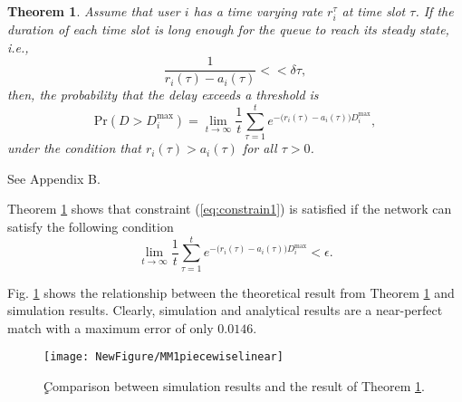\documentclass[journal,draftclsnofoot,onecolumn,12pt]{IEEEtran}%
\newtheorem{theorem}{\bf Theorem}
\begin{document}
	\begin{theorem} \label{prop:packet length}
		Assume that user $i$ has a time varying rate $r_i^{\tau}$ at time slot $\tau$. If the duration  of each time slot is long enough for the queue to reach its steady state, i.e., 
		\begin{equation}\label{eq:time slot condition}
		\frac{1}{r_i(\tau)-a_i(\tau)}<<\delta \tau,
		\end{equation}
		then, the probability that the delay exceeds a threshold is 
		\begin{equation}\label{eq:time average delay}
		\text{Pr}(D>D_i^{\max})=	\lim_{t\to \infty} \frac{1}{t} \sum_{\tau=1}^{t} e^{-\big(r_i(\tau)-a_i(\tau)\big)D_i^{\max}},	
		\end{equation}
		under the condition that $r_i(\tau)>a_i(\tau)$ for all $\tau>0$.
	\end{theorem}
	\begin{IEEEproof}
		See Appendix B.
	\end{IEEEproof}
	
	
	Theorem \ref{prop:packet length} shows that constraint (\ref{eq:constrain1}) is satisfied if the network can satisfy the following condition 
	\begin{equation}\label{eq:2b transformed}
	\lim_{t\to \infty} \frac{1}{t} \sum_{\tau=1}^{t} e^{-\big(r_i(\tau)-a_i(\tau)\big)D_i^{\max}}<\epsilon.
	\end{equation}
	
    Fig. \ref{fig:proposition} shows the relationship between the theoretical result from Theorem \ref{prop:packet length} and simulation results. Clearly, simulation and analytical results are a near-perfect match with a maximum error of only $0.0146$.
    	\begin{figure}[!t]
		\centering
		\texttt{[image: NewFigure/MM1piecewiselinear]}
		\caption{ٍComparison between simulation results and the result of Theorem \ref{prop:packet length}. }
		\label{fig:proposition}
	\end{figure}
    
\end{document}

